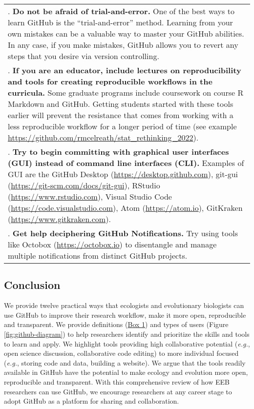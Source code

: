 \begin{tablenos:no-prefix-table-caption}
\begin{longtable}[]{@{}
  >{\raggedright\arraybackslash}p{}@{}}
7. \textbf{Do not be afraid of trial-and-error.} One of the best ways to learn GitHub is the ``trial-and-error'' method. Learning from your own mistakes can be a valuable way to master your GitHub abilities. In any case, if you make mistakes, GitHub allows you to revert any steps that you desire via version controlling. \\
8. \textbf{If you are an educator, include lectures on reproducibility and tools for creating reproducible workflows in the curricula.} Some graduate programs include coursework on course R Markdown and GitHub. Getting students started with these tools earlier will prevent the resistance that comes from working with a less reproducible workflow for a longer period of time (see example \url{https://github.com/rmcelreath/stat_rethinking_2022}). \\
9. \textbf{Try to begin committing with graphical user interfaces (GUI) instead of command line interfaces (CLI).} Examples of GUI are the GitHub Desktop (\url{https://desktop.github.com}), git-gui (\url{https://git-scm.com/docs/git-gui}), RStudio (\url{https://www.rstudio.com}), Visual Studio Code (\url{https://code.visualstudio.com}), Atom (\url{https://atom.io}), GitKraken (\url{https://www.gitkraken.com}). \\
10. \textbf{Get help deciphering GitHub Notifications.} Try using tools like Octobox (\url{https://octobox.io}) to disentangle and manage multiple notifications from distinct GitHub projects. \\
\bottomrule()
\end{longtable}

\end{tablenos:no-prefix-table-caption}

\hypertarget{conclusion}{%
\subsection{Conclusion}\label{conclusion}}

We provide twelve practical ways that ecologists and evolutionary biologists can use GitHub to improve their research workflow, make it more open, reproducible and transparent.
We provide definitions (\protect\hyperlink{definitions}{Box 1}) and types of users (Figure \ref{fig:github-diagram}) to help researchers identify and prioritize the skills and tools to learn and apply.
We highlight tools providing high collaborative potential (\emph{e.g.}, open science discussion, collaborative code editing) to more individual focused (\emph{e.g.}, storing code and data, building a website).
We argue that the tools readily available in GitHub have the potential to make ecology and evolution more open, reproducible and transparent.
With this comprehensive review of how EEB researchers can use GitHub, we encourage researchers at any career stage to adopt GitHub as a platform for sharing and collaboration.

